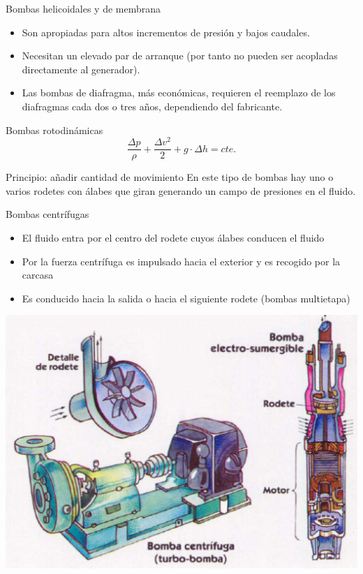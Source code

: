 \documentclass[xcolor={usenames,svgnames,dvipsnames}]{beamer}
\begin{document}
\begin{frame}[label={sec:orgf82a0cd}]{Bombas helicoidales y de membrana}
\begin{itemize}
\item Son apropiadas para \alert{altos incrementos de presión y bajos caudales}.

\item Necesitan un \alert{elevado par de arranque} (por tanto no pueden ser acopladas directamente al generador).

\item Las bombas de diafragma, más económicas, requieren el \alert{reemplazo de los diafragmas} cada dos o tres años, dependiendo del fabricante.
\end{itemize}
\end{frame}

\begin{frame}[label={sec:org26cfe8f}]{Bombas rotodinámicas}
\[
\frac{\Delta p}{\rho}+\frac{\Delta v^2}{2}+g\cdot\Delta h=cte.
\]

\begin{block}{\alert{Principio}: añadir cantidad de movimiento}
En este tipo de bombas hay uno o varios rodetes con álabes que giran generando un campo de presiones en el fluido.
\end{block}
\end{frame}

\begin{frame}[label={sec:orgc93d13d}]{Bombas centrífugas}
\begin{itemize}
\item El fluido entra por el centro del rodete cuyos álabes conducen el fluido

\item Por la fuerza centrífuga es impulsado hacia el exterior y es recogido por la carcasa

\item Es conducido hacia la salida o hacia el siguiente rodete (bombas multietapa)
\end{itemize}

\begin{center}
\includegraphics[height=0.5\textheight]{../figs/BombaCentrifuga.pdf}
\end{center}
\end{frame}
\end{document}
